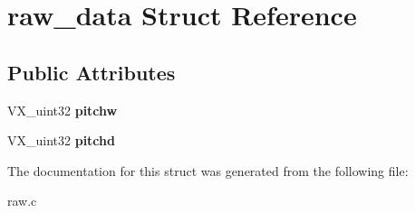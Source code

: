 \hypertarget{structraw__data}{\section{raw\-\_\-data Struct Reference}
\label{structraw__data}
}
\subsection*{Public Attributes}
\begin{DoxyCompactItemize}
\item 
\hypertarget{structraw__data_a27f601c2dcef41847e291aea6a92204c}{V\-X\-\_\-uint32 {\bfseries pitchw}}\label{structraw__data_a27f601c2dcef41847e291aea6a92204c}

\item 
\hypertarget{structraw__data_a88118fe0821a2990a547a930c779779c}{V\-X\-\_\-uint32 {\bfseries pitchd}}\label{structraw__data_a88118fe0821a2990a547a930c779779c}

\end{DoxyCompactItemize}


The documentation for this struct was generated from the following file\-:\begin{DoxyCompactItemize}
\item 
raw.\-c\end{DoxyCompactItemize}
